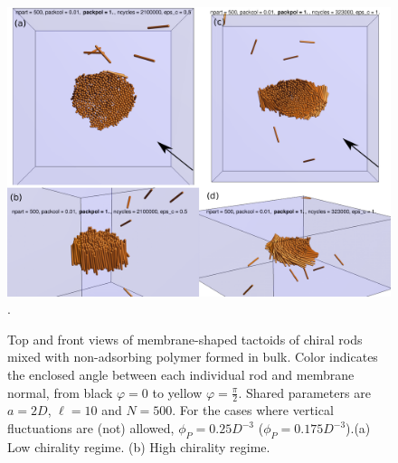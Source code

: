 \begin{figure}
\begin{center}
\includegraphics[width= .8\columnwidth]{figures/chapter-5/samples}.
	\caption{Top and front views of membrane-shaped tactoids of chiral rods mixed with non-adsorbing polymer formed in bulk. Color indicates the enclosed angle between each individual rod and membrane normal, from black $\varphi = 0$ to yellow $\varphi = \frac{\pi}{2}$. Shared parameters are $a = 2D$, $\ell = 10$ and $N = 500$. For the cases where vertical fluctuations are (not) allowed, $\phi_P=0.25D^{-3}$ ($\phi_P=0.175D^{-3}$).(a) Low chirality regime. (b) High chirality regime.}
\end{center}
\end{figure}


